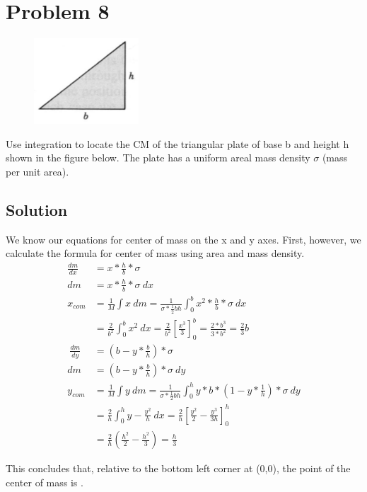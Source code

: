 \documentclass[12pt]{article}
\begin{document}
\pagebreak
\section*{Problem 8}
\begin{figure}
    \vspace{-30pt}
    \includegraphics[width=0.35\textwidth]{graph_8.png} 
\end{figure}
Use integration to locate the CM of the triangular plate of base b and height h shown in the figure below.
The plate has a uniform areal mass density $\sigma$ (mass per unit area).

\subsection*{Solution}
We know our equations for center of mass on the x and y axes. First, however, we calculate the formula for center of mass using area and mass density.
\begin{align*}
    \frac{dm}{dx}   &=  x*\frac{h}{b}*\sigma\\
    dm  &=  x*\frac{h}{b}*\sigma\ dx\\
    x_{com} &=  \frac{1}{M}\int x\ dm
        =   \frac{1}{\sigma*\frac{1}{2}bh}\int_{0}^{b} x^2*\frac{h}{b}*\sigma\ dx\\
        &=  \frac{2}{b^2}\int_{0}^{b} x^2\ dx
        =   \frac{2}{b^2}\left[\frac{x^3}{3}\right]_{0}^{b}
        =   \frac{2*b^3}{3*b^2} = \frac{2}{3}b\\
    \
    \frac{dm}{dy}   &=  \left(b - y*\frac{b}{h}\right)*\sigma\\
    dm  &=  \left(b - y*\frac{b}{h}\right)*\sigma\ dy\\
    y_{com} &=  \frac{1}{M}\int y\ dm
        =   \frac{1}{\sigma*\frac{1}{2}bh}\int_{0}^{h} y*b*\left(1-y*\frac{1}{h}\right)*\sigma\ dy\\
        &=  \frac{2}{h}\int_{0}^{h} y - \frac{y^2}{h}\ dx
        =   \frac{2}{h}\left[\frac{y^2}{2} - \frac{y^3}{3h}\right]_{0}^{h}\\
        &=  \frac{2}{h}\left(\frac{h^2}{2}-\frac{h^2}{3}\right)
        =   \frac{h}{3} 
\end{align*}

This concludes that, relative to the bottom left corner at (0,0), the point of the center of mass is .
\end{document}
